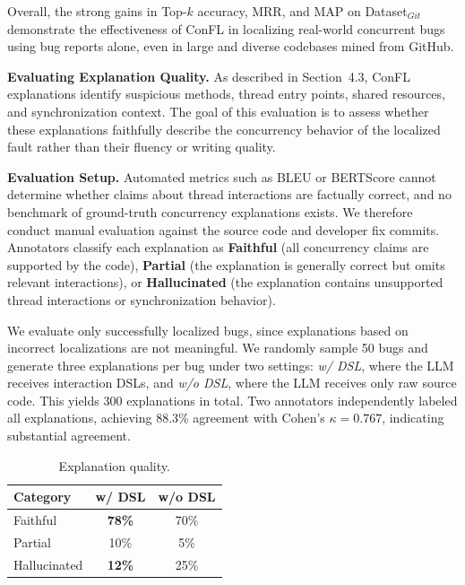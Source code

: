 Overall, the strong gains in Top-$k$ accuracy, MRR, and MAP on Dataset$_{Git}$ demonstrate the effectiveness of ConFL in localizing real-world concurrent bugs using bug reports alone, even in large and diverse codebases mined from GitHub.


\noindent\textbf{Evaluating Explanation Quality.}
As described in Section~4.3, ConFL explanations identify suspicious methods, thread entry points, shared resources, and synchronization context. The goal of this evaluation is to assess whether these explanations faithfully describe the concurrency behavior of the localized fault rather than their fluency or writing quality.

\noindent\textbf{Evaluation Setup.}
Automated metrics such as BLEU or BERTScore cannot determine whether claims about thread interactions are factually correct, and no benchmark of ground-truth concurrency explanations exists. We therefore conduct manual evaluation against the source code and developer fix commits. Annotators classify each explanation as \textbf{Faithful} (all concurrency claims are supported by the code), \textbf{Partial} (the explanation is generally correct but omits relevant interactions), or \textbf{Hallucinated} (the explanation contains unsupported thread interactions or synchronization behavior).

We evaluate only successfully localized bugs, since explanations based on incorrect localizations are not meaningful. We randomly sample 50 bugs and generate three explanations per bug under two settings: \textit{w/ DSL}, where the LLM receives interaction DSLs, and \textit{w/o DSL}, where the LLM receives only raw source code. This yields 300 explanations in total. Two annotators independently labeled all explanations, achieving 88.3\% agreement with Cohen's $\kappa = 0.767$, indicating substantial agreement.

\begin{table}\footnotesize
\vspace{-10pt}
\centering
\caption{Explanation quality.}
\vspace{-8pt}
\label{tab:explanation}
\begin{tabular}{lcc}
\toprule
Category & w/ DSL & w/o DSL \\
\midrule
Faithful     & \textbf{78\%} & 70\%          \\
Partial      & 10\%          & 5\%           \\
Hallucinated & \textbf{12\%} & 25\%          \\
\bottomrule
\end{tabular}
\vspace{-10pt}
\end{table}


